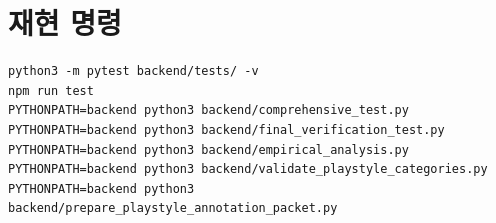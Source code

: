 \documentclass[11pt,a4paper]{article}
\begin{document}
\section{재현 명령}
\begin{verbatim}
python3 -m pytest backend/tests/ -v
npm run test
PYTHONPATH=backend python3 backend/comprehensive_test.py
PYTHONPATH=backend python3 backend/final_verification_test.py
PYTHONPATH=backend python3 backend/empirical_analysis.py
PYTHONPATH=backend python3 backend/validate_playstyle_categories.py
PYTHONPATH=backend python3 backend/prepare_playstyle_annotation_packet.py
\end{verbatim}
\end{document}
